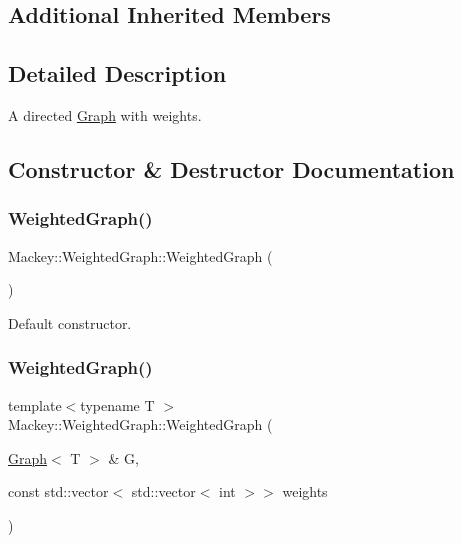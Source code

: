 \subsection*{Additional Inherited Members}


\subsection{Detailed Description}
A directed \hyperlink{classMackey_1_1Graph}{Graph} with weights. 

\subsection{Constructor \& Destructor Documentation}
\mbox{\label{classMackey_1_1WeightedGraph_afed3bc23878489313a0bf8770898759a}} 
\subsubsection{\texorpdfstring{Weighted\+Graph()}{WeightedGraph()}\hspace{0.1cm}{\footnotesize\ttfamily [1/4]}}
{\footnotesize\ttfamily Mackey\+::\+Weighted\+Graph\+::\+Weighted\+Graph (\begin{DoxyParamCaption}{ }\end{DoxyParamCaption})\hspace{0.3cm}{\ttfamily [inline]}}



Default constructor. 

\mbox{\label{classMackey_1_1WeightedGraph_a080db5a1861342bba8ba62c55a3bac95}} 
\subsubsection{\texorpdfstring{Weighted\+Graph()}{WeightedGraph()}\hspace{0.1cm}{\footnotesize\ttfamily [2/4]}}
{\footnotesize\ttfamily template$<$typename T $>$ \\
Mackey\+::\+Weighted\+Graph\+::\+Weighted\+Graph (\begin{DoxyParamCaption}\item[{\hyperlink{classMackey_1_1Graph}{Graph}$<$ T $>$ \&}]{G,  }\item[{const std\+::vector$<$ std\+::vector$<$ int $>$$>$}]{weights }\end{DoxyParamCaption})\hspace{0.3cm}{\ttfamily [inline]}}



